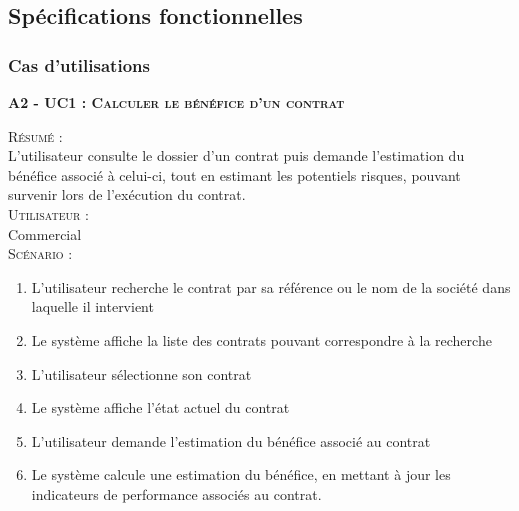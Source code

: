 \subsection{Spécifications fonctionnelles}

\subsubsection{Cas d’utilisations}

\noindent\textsc{\bf{A2 - UC1 :} Calculer le bénéfice d’un contrat}
\begin{shaded}
\noindent\textsc{Résumé :}\\

L’utilisateur consulte le dossier d’un contrat puis demande l’estimation du bénéfice associé à celui-ci, tout en estimant les potentiels risques, pouvant survenir lors de l’exécution du contrat. \\

\noindent\textsc{Utilisateur :} \\

Commercial \\

\noindent\textsc{Scénario :} \\
\begin{enumerate}
    \item L’utilisateur recherche le contrat par sa référence ou le nom de la société dans laquelle il intervient
    \item Le système affiche la liste des contrats pouvant correspondre à la recherche
    \item L’utilisateur sélectionne son contrat
    \item Le système affiche l’état actuel du contrat
    \item L’utilisateur demande l’estimation du bénéfice associé au contrat
    \item Le système calcule une estimation du bénéfice, en mettant à jour les indicateurs de performance associés au contrat.
\end{enumerate}
\end{shaded}

